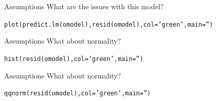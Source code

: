 \documentclass{beamer}\usepackage[]{graphicx}\usepackage[]{color}
\makeatletter
\newcommand{\hlstr}[1]{\textcolor[rgb]{1,0.894,0.71}{#1}}%
\newcommand{\hlstd}[1]{\textcolor[rgb]{1,0.894,0.769}{#1}}%
\newcommand{\hlkwc}[1]{\textcolor[rgb]{0.78,0.941,0.545}{#1}}%
\newcommand{\hlkwd}[1]{\textcolor[rgb]{1,0.78,0.769}{#1}}%
\newenvironment{kframe}{%
 \def\at@end@of@kframe{}%
 \ifinner\ifhmode%
  \def\at@end@of@kframe{\end{minipage}}%
  \begin{minipage}{\columnwidth}%
 \fi\fi%
 \def\FrameCommand##1{\hskip\@totalleftmargin \hskip-\fboxsep
 \colorbox{shadecolor}{##1}\hskip-\fboxsep
     \hskip-\linewidth \hskip-\@totalleftmargin \hskip\columnwidth}%
 \MakeFramed {\advance\hsize-\width
   \@totalleftmargin\z@ \linewidth\hsize
   \@setminipage}}%
 {\par\unskip\endMakeFramed%
 \at@end@of@kframe}
\newenvironment{knitrout}{}{} %
\makeatother
\begin{document}
\begin{darkframes}
      \begin{frame}[fragile]{Assumptions}
        \fontsize{9}{9}\selectfont
        What are the issues with this model?
        \lc
\begin{knitrout}
\begin{kframe}
\begin{alltt}
\hlkwd{plot}\hlstd{(}\hlkwd{predict.lm}\hlstd{(omodel),} \hlkwd{resid}\hlstd{(omodel),} \hlkwc{col}\hlstd{=}\hlstr{'green'}\hlstd{,} \hlkwc{main}\hlstd{=}\hlstr{''}\hlstd{)}
\end{alltt}
\end{kframe}


\end{knitrout}
      
      \end{frame}
      
      
      
      \begin{frame}[fragile]{Assumptions}
      \fontsize{9}{9}\selectfont
        What about normality?
\begin{knitrout}
\begin{kframe}
\begin{alltt}
  \hlkwd{hist}\hlstd{(}\hlkwd{resid}\hlstd{(omodel),} \hlkwc{col}\hlstd{=}\hlstr{'green'}\hlstd{,} \hlkwc{main}\hlstd{=}\hlstr{''}\hlstd{)}
\end{alltt}
\end{kframe}


\end{knitrout}
      
      \end{frame}
      
      
      \begin{frame}[fragile]{Assumptions}
        \fontsize{9}{9}\selectfont
        What about normality?
        
\begin{knitrout}
\begin{kframe}
\begin{alltt}
  \hlkwd{qqnorm}\hlstd{(}\hlkwd{resid}\hlstd{(omodel),} \hlkwc{col}\hlstd{=}\hlstr{'green'}\hlstd{,} \hlkwc{main}\hlstd{=}\hlstr{''}\hlstd{)}
\end{alltt}
\end{kframe}



\end{knitrout}
\end{frame}
\end{darkframes}
\end{document}
